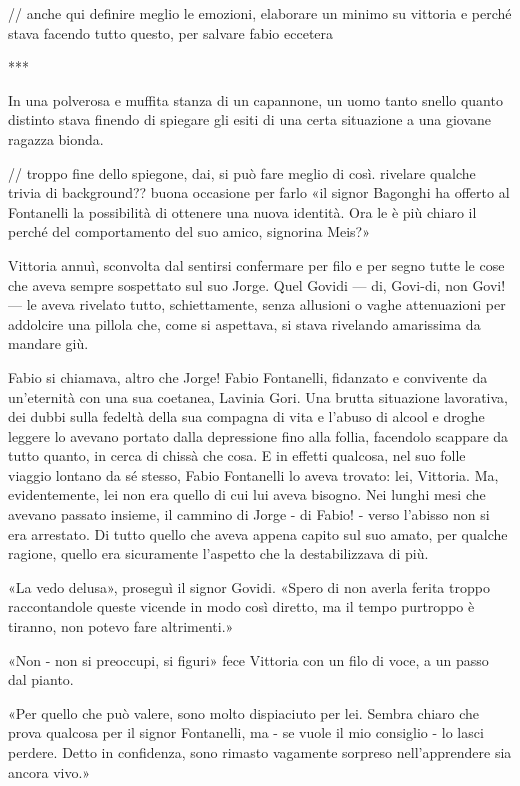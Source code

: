 // anche qui definire meglio le emozioni, elaborare un minimo su vittoria e perché stava facendo tutto questo, per salvare fabio eccetera

***

In una polverosa e muffita stanza di un capannone, un uomo tanto snello quanto distinto stava finendo di spiegare gli esiti di una certa situazione a una giovane ragazza bionda.

// troppo fine dello spiegone, dai, si può fare meglio di così. rivelare qualche trivia di background?? buona occasione per farlo
« il signor Bagonghi ha offerto al Fontanelli la possibilità di ottenere una nuova identità. Ora le è più chiaro il perché del comportamento del suo amico, signorina Meis?»

Vittoria annuì, sconvolta dal sentirsi confermare per filo e per segno tutte le cose che aveva sempre sospettato sul suo Jorge. Quel Govidi --- di, Govi-di, non Govi! --- le aveva rivelato tutto, schiettamente, senza allusioni o vaghe attenuazioni per addolcire una pillola che, come si aspettava, si stava rivelando amarissima da mandare giù.

Fabio si chiamava, altro che Jorge! Fabio Fontanelli, fidanzato e convivente da un'eternità con una sua coetanea, Lavinia Gori. Una brutta situazione lavorativa, dei dubbi sulla fedeltà della sua compagna di vita e l'abuso di alcool e droghe leggere lo avevano portato dalla depressione fino alla follia, facendolo scappare da tutto quanto, in cerca di chissà che cosa. E in effetti qualcosa, nel suo folle viaggio lontano da sé stesso, Fabio Fontanelli lo aveva trovato: lei, Vittoria. Ma, evidentemente, lei non era quello di cui lui aveva bisogno. Nei lunghi mesi che avevano passato insieme, il cammino di Jorge - di Fabio! - verso l'abisso non si era arrestato. Di tutto quello che aveva appena capito sul suo amato, per qualche ragione, quello era sicuramente l'aspetto che la destabilizzava di più.

«La vedo delusa», proseguì il signor Govidi. «Spero di non averla ferita troppo raccontandole queste vicende in modo così diretto, ma il tempo purtroppo è tiranno, non potevo fare altrimenti.»

«Non - non si preoccupi, si figuri» fece Vittoria con un filo di voce, a un passo dal pianto.

«Per quello che può valere, sono molto dispiaciuto per lei. Sembra chiaro che prova qualcosa per il signor Fontanelli, ma - se vuole il mio consiglio - lo lasci perdere. Detto in confidenza, sono rimasto vagamente sorpreso nell'apprendere sia ancora vivo.»

